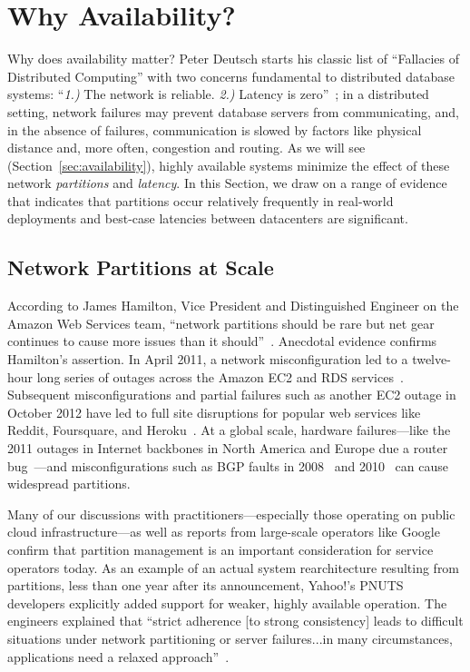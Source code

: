 
\section{Why Availability?}
\label{sec:motivation}

Why does availability matter? Peter Deutsch starts his classic list of
``Fallacies of Distributed Computing'' with two concerns fundamental
to distributed database systems: ``\textit{1.)}  The network is
reliable. \textit{2.)} Latency is zero''~\cite{fallacies-deutsch}; in
a distributed setting, network failures may prevent database servers
from communicating, and, in the absence of failures, communication is
slowed by factors like physical distance and, more often, congestion
and routing. As we will see (Section~\ref{sec:availability}), highly
available systems minimize the effect of these network
\textit{partitions} and \textit{latency}. In this Section, we draw on
a range of evidence that indicates that partitions occur relatively
frequently in real-world deployments and best-case latencies between
datacenters are significant.

\subsection{Network Partitions at Scale}

According to James Hamilton, Vice President and Distinguished Engineer
on the Amazon Web Services team, ``network partitions should be rare
but net gear continues to cause more issues than it
should''~\cite{hamilton-partitions}. Anecdotal evidence confirms
Hamilton's assertion. In April 2011, a network misconfiguration led to
a twelve-hour long series of outages across the Amazon EC2 and RDS
services~\cite{amazon-netpartition}. Subsequent misconfigurations and
partial failures such as another EC2 outage in October 2012 have led
to full site disruptions for popular web services like Reddit,
Foursquare, and Heroku~\cite{ec2-downsites}. At a global scale,
hardware failures---like the 2011 outages in Internet backbones in
North America and Europe due a router
bug~\cite{juniper-partition}---and misconfigurations such as BGP
faults in 2008~\cite{pakistan-youtube} and
2010~\cite{research-experiment-partition} can cause widespread
partitions.

Many of our discussions with practitioners---especially those
operating on public cloud infrastructure---as well as reports from
large-scale operators like Google~\cite{dean-keynote} confirm that
partition management is an important consideration for service operators
today. As an example of an actual system rearchitecture resulting from
partitions, less than one year after its announcement, Yahoo!'s PNUTS
developers explicitly added support for weaker, highly available
operation. The engineers explained that ``strict adherence [to strong
  consistency] leads to difficult situations under network
partitioning or server failures...in many circumstances, applications
need a relaxed approach''~\cite{pnuts-update}.

